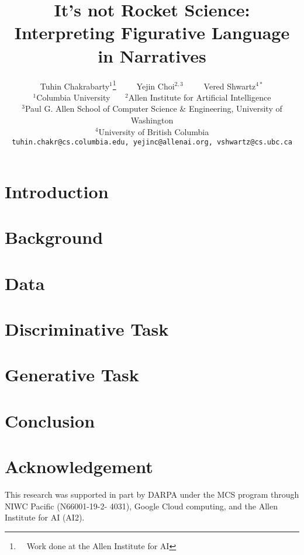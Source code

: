 \documentclass[11pt,a4paper]{article}
\title{It's not Rocket Science:\\Interpreting Figurative Language in Narratives}
\author{Tuhin Chakrabarty$^1$\thanks{~~Work done at the Allen Institute for AI}~~~~~Yejin Choi$^{2,3}$~~~~~Vered Shwartz$^{4*}$ \\
 $^1$Columbia University~~~ $^2$Allen Institute for Artificial Intelligence\\
 $^3$Paul G. Allen School of Computer Science \& Engineering, University of Washington\\  
 $^4$University of British Columbia\\
 {\tt\small tuhin.chakr@cs.columbia.edu, yejinc@allenai.org, vshwartz@cs.ubc.ca} \\
}
\begin{document}
\setlength{\parskip}{0pt}
\maketitle
\begin{abstract}

\end{abstract}

\section{Introduction}
\label{sec:intro}


\section{Background}
\label{sec:bg}


\section{Data}
\label{sec:data}


\section{Discriminative Task}
\label{sec:disc}


\section{Generative Task}
\label{sec:generative}


\section{Conclusion}
\label{sec:conclusion}


\section{Acknowledgement}
This research was supported in part by DARPA under the MCS program through NIWC Pacific (N66001-19-2- 4031), Google Cloud computing, and the Allen Institute for AI (AI2).




\end{document}
